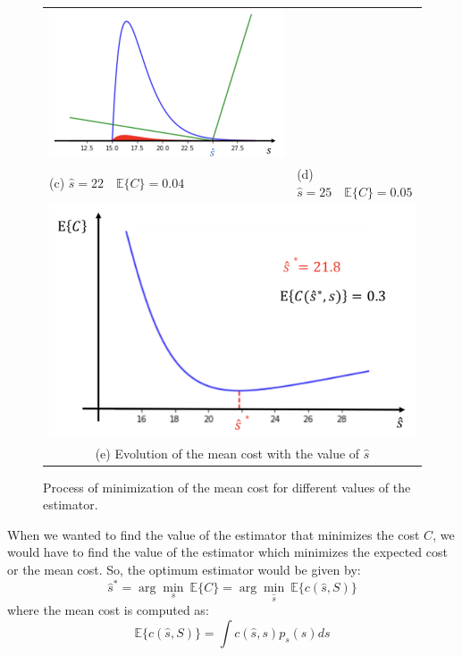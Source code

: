 \begin{solution}
\begin{itemize}
\begin{figure}[!t]
\begin{tabular}{m{}m{}}
\includegraphics[scale=.3]{Figures/Fig_MC1_9.png}\\
(c) $\hat{s} = 22  \quad \mathbb{E}\{C\}= 0.04$ &
(d) $\hat{s} =  25 \quad \mathbb{E}\{C\}=0.05$ \\
\multicolumn{2}{c}{\includegraphics[scale=.25]{Figures/Fig_MC1_10.png}}\\
\multicolumn{2}{c}{(e) Evolution of the mean cost with the value of $\hat{s}$}
\end{tabular}
\caption{Process of minimization of the mean cost for different values of the estimator.}
\label{Fig_MC1_6_9}
\end{figure}

When we wanted to find the value of the estimator that minimizes the cost $C$, we would have to find the value of the estimator which minimizes the expected cost or the mean cost. So, the optimum estimator would be given by:
$$ \hat{s}^{*} = \arg\min_s~ \mathbb{E}\{C\} = \arg\min_{\hat{s}}~ \mathbb{E}\{c(\hat{s},S)\}$$
where the mean cost is computed as:
$$\mathbb{E}\{c(\hat{s},S)\} = \int c(\hat{s},s) p_s(s) ds$$



\end{itemize}
\end{solution}
